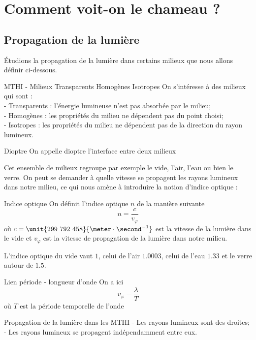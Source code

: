 \documentclass{classe}
\begin{document}
\section{Comment voit-on le chameau ?}
\subsection{Propagation de la lumière}
Étudions la propagation de la lumière dans certains milieux que nous allons définir ci-dessous.
\begin{définition}{MTHI - Milieux Transparents Homogènes Isotropes}{}
On s'intéresse à des milieux qui sont :\\
- Transparents : l'énergie lumineuse n'est pas absorbée par le milieu;\\
- Homogènes : les propriétés du milieu ne dépendent pas du point choisi;\\
- Isotropes : les propriétés du milieu ne dépendent pas de la direction du rayon lumineux.
\end{définition}
\begin{définition}{Dioptre}{}
On appelle dioptre l'interface entre deux milieux
\end{définition}
Cet ensemble de milieux regroupe par exemple le vide, l'air, l'eau ou bien le verre. On peut se demander à quelle vitesse se propagent les rayons lumineux dans notre milieu, ce qui nous amène à introduire la notion d'indice optique :
\begin{définition}{Indice optique}{}
On définit l'indice optique $n$ de la manière suivante
\begin{equation*}
	n=\frac{c}{v_\varphi}
\end{equation*}
où $c =\unit{299~792~458}{\meter\cdot\second^{-1}}$ est la vitesse de la lumière dans le vide et $v_\varphi$ est la vitesse de propagation de la lumière dans notre milieu.
\end{définition}
\begin{example}
	L'indice optique du vide vaut $1$, celui de l'air $1.0003$, celui de l'eau $1.33$ et le verre autour de $1.5$.
\end{example}
\begin{remarque}{Lien période - longueur d'onde}{}
	On a ici
	\begin{equation*}
		v_\varphi = \frac{\lambda}{T}
	\end{equation*}
	où $T$ est la période temporelle de l'onde
\end{remarque}
\begin{théorème}{Propagation de la lumière dans les MTHI}{}
- Les rayons lumineux sont des droites;\\
- Les rayons lumineux se propagent indépendamment entre eux.
\end{théorème}
\end{document}
